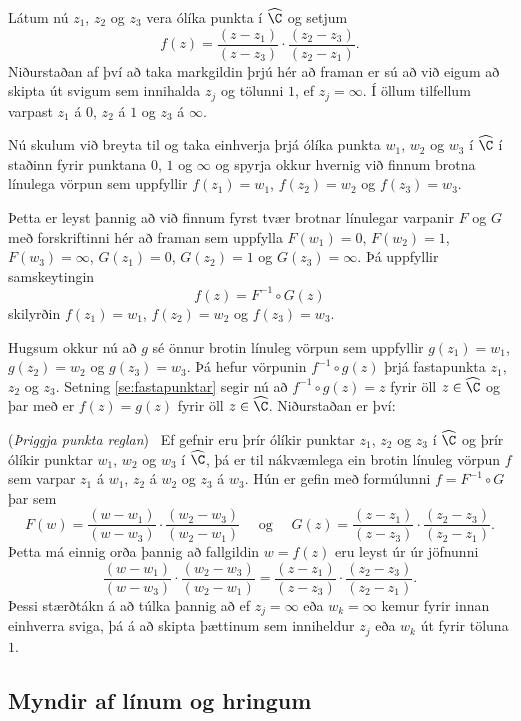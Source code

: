 Látum nú $z_1$, $z_2$ og $z_3$ vera ólíka punkta í $\widehat \C$ og
setjum
$$
f(z)=\dfrac{(z-z_1)}{(z-z_3)}\cdot \dfrac{(z_2-z_3)}{(z_2-z_1)}.
$$
Niðurstaðan af því að taka markgildin þrjú hér að framan er sú að við
eigum að skipta  út svigum sem innihalda $z_j$ og tölunni $1$,
ef $z_j=\infty$.  Í öllum tilfellum varpast $z_1$ á $0$, $z_2$ á 
$1$ og $z_3$ á $\infty$.

Nú skulum við breyta til og taka einhverja þrjá ólíka punkta $w_1$,
$w_2$ og $w_3$ í $\widehat \C$  í staðinn fyrir punktana $0$, $1$ 
og $\infty$ og spyrja okkur hvernig við finnum brotna línulega vörpun
sem uppfyllir $f(z_1)=w_1$, $f(z_2)=w_2$ og $f(z_3)=w_3$.  

Þetta er leyst þannig að við finnum fyrst tvær brotnar línulegar
varpanir $F$ og $G$ með forskriftinni hér að framan sem uppfylla
$F(w_1)=0$, $F(w_2)=1$, $F(w_3)=\infty$, $G(z_1)=0$, $G(z_2)=1$ og 
$G(z_3)=\infty$.  Þá uppfyllir samskeytingin
$$
f(z)=F^{-1}\circ G(z)
$$
skilyrðin $f(z_1)=w_1$, $f(z_2)=w_2$ og $f(z_3)=w_3$.  

Hugsum okkur nú að $g$ sé önnur brotin línuleg vörpun 
sem uppfyllir $g(z_1)=w_1$, $g(z_2)=w_2$ og $g(z_3)=w_3$.
Þá hefur vörpunin $f^{-1}\circ g(z)$ þrjá fastapunkta
$z_1$, $z_2$ og $z_3$.   Setning \ref{se:fastapunktar} segir nú að 
$f^{-1}\circ g(z)=z$ fyrir öll $z\in \widehat \C$ og þar með
er $f(z)=g(z)$ fyrir öll $z\in \widehat \C$.  Niðurstaðan er því:

\begin{se}\label{se:thrir_punktar} {\rm ({\it Þriggja punkta reglan})} 
\  Ef gefnir eru þrír ólíkir punktar $z_1$, $z_2$ og $z_3$ í $\widehat
\C$ og þrír ólíkir punktar $w_1$, $w_2$ og $w_3$ í $\widehat \C$,
þá er til nákvæmlega ein brotin línuleg vörpun $f$ sem varpar
$z_1$ á $w_1$, $z_2$ á $w_2$ og $z_3$ á $w_3$.  Hún er gefin með
formúlunni $f=F^{-1}\circ G$ þar sem 
$$
F(w)=\dfrac{(w-w_1)}{(w-w_3)}\cdot \dfrac{(w_2-w_3)}{(w_2-w_1)}
\quad \text{ og } \quad 
G(z)=\dfrac{(z-z_1)}{(z-z_3)}\cdot \dfrac{(z_2-z_3)}{(z_2-z_1)}.
$$
Þetta má einnig orða þannig að fallgildin $w=f(z)$ eru leyst úr úr
jöfnunni
$$
\dfrac{(w-w_1)}{(w-w_3)}\cdot \dfrac{(w_2-w_3)}{(w_2-w_1)}
=
\dfrac{(z-z_1)}{(z-z_3)}\cdot \dfrac{(z_2-z_3)}{(z_2-z_1)}.
$$
Þessi stærðtákn á að túlka þannig að ef $z_j=\infty$ eða
$w_k=\infty$ kemur fyrir innan einhverra sviga, þá á að skipta
þættinum sem inniheldur $z_j$ eða $w_k$ út
fyrir töluna $1$.
\end{se}

\subsection*{Myndir af línum og hringum}

